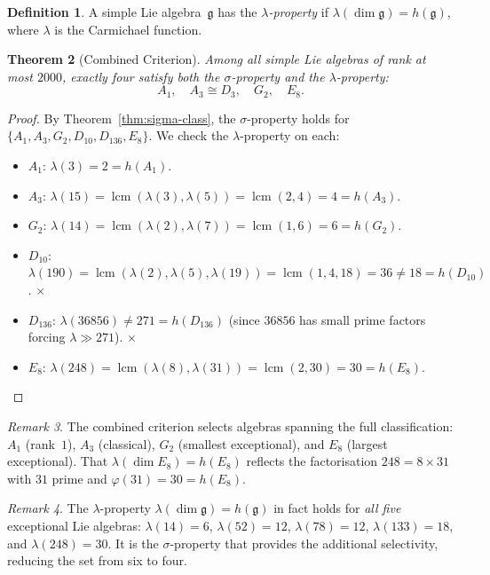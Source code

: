 \documentclass[11pt]{amsart}
\theoremstyle{plain}
\newtheorem{theorem}{Theorem}[section]
\theoremstyle{definition}
\newtheorem{definition}[theorem]{Definition}
\theoremstyle{remark}
\newtheorem{remark}[theorem]{Remark}
\newcommand{\fg}{\mathfrak{g}}
\newcommand{\lcm}{\operatorname{lcm}}
\begin{document}
\begin{definition}\label{def:lambda-property}
A simple Lie algebra~$\fg$ has the \emph{$\lambda$-property} if
$\lambda(\dim\fg) = h(\fg)$, where $\lambda$ is the Carmichael function.
\end{definition}

\begin{theorem}[Combined Criterion]\label{thm:combined}
Among all simple Lie algebras of rank at most $2000$, exactly four
satisfy both the $\sigma$-property and the $\lambda$-property:
\[
  A_1, \quad A_3 \cong D_3, \quad G_2, \quad E_8.
\]
\end{theorem}

\begin{proof}
By Theorem~\ref{thm:sigma-class}, the $\sigma$-property holds for
$\{A_1, A_3, G_2, D_{10}, D_{136}, E_8\}$.  We check the $\lambda$-property
on each:
\begin{itemize}
  \item $A_1$: $\lambda(3) = 2 = h(A_1)$. \checkmark
  \item $A_3$: $\lambda(15) = \lcm(\lambda(3),\lambda(5)) = \lcm(2,4) = 4 = h(A_3)$. \checkmark
  \item $G_2$: $\lambda(14) = \lcm(\lambda(2),\lambda(7)) = \lcm(1,6) = 6 = h(G_2)$. \checkmark
  \item $D_{10}$: $\lambda(190) = \lcm(\lambda(2),\lambda(5),\lambda(19)) = \lcm(1,4,18) = 36 \ne 18 = h(D_{10})$. $\times$
  \item $D_{136}$: $\lambda(36856) \ne 271 = h(D_{136})$ (since $36856$ has small prime factors forcing $\lambda \gg 271$). $\times$
  \item $E_8$: $\lambda(248) = \lcm(\lambda(8),\lambda(31)) = \lcm(2,30) = 30 = h(E_8)$. \checkmark
\end{itemize}
\end{proof}

\begin{remark}\label{rem:combined-meaning}
The combined criterion selects algebras spanning the full
classification: $A_1$ (rank~$1$), $A_3$ (classical), $G_2$ (smallest exceptional), and
$E_8$ (largest exceptional).  That $\lambda(\dim E_8) = h(E_8)$
reflects the factorisation $248 = 8 \times 31$ with $31$ prime and
$\varphi(31) = 30 = h(E_8)$.
\end{remark}

\begin{remark}\label{rem:lambda-all-exceptionals}
The $\lambda$-property $\lambda(\dim\fg) = h(\fg)$ in fact holds for
\emph{all five} exceptional Lie algebras: $\lambda(14) = 6$,
$\lambda(52) = 12$, $\lambda(78) = 12$, $\lambda(133) = 18$, and
$\lambda(248) = 30$.  It is the $\sigma$-property that provides the
additional selectivity, reducing the set from six to four.
\end{remark}
\end{document}
